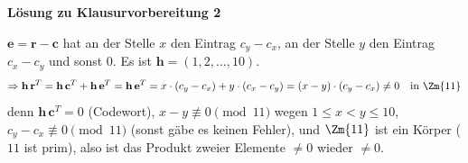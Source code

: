 \textbf{Lösung zu Klausurvorbereitung 2}

\begin{loesung}
$\mathbf{e} = \mathbf{r} - \mathbf{c}$ hat an der Stelle $x$ den Eintrag $c_y - c_x$, an der Stelle $y$ den Eintrag $c_x - c_y$ und sonst $0$. Es ist $\mathbf{h} = (1, 2, \dots, 10)$.
\[
\Rightarrow \mathbf{h}\,\mathbf{r}^T = \mathbf{h}\,\mathbf{c}^T + \mathbf{h}\,\mathbf{e}^T = \mathbf{h}\,\mathbf{e}^T = x \cdot (c_y - c_x) + y \cdot (c_x - c_y) = (x - y) \cdot (c_y - c_x) \neq 0 \quad \text{in } \Zm{11}
\]
denn $\mathbf{h}\,\mathbf{c}^T = 0$ (Codewort), $x - y \not\equiv 0 \pmod{11}$ wegen $1 \le x < y \le 10$, $c_y - c_x \not\equiv 0 \pmod{11}$ (sonst gäbe es keinen Fehler), und $\Zm{11}$ ist ein Körper ($11$ ist prim), also ist das Produkt zweier Elemente $\neq 0$ wieder $\neq 0$.
\end{loesung}
